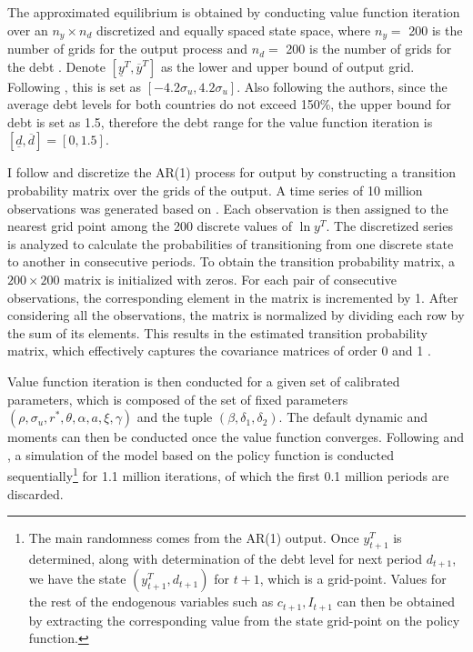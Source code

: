 The approximated equilibrium is obtained by conducting value function iteration over an $n_y \times n_d$ discretized and equally spaced state space,
where $n_y = $ 200 is the number of grids for the output process and $n_d=$ 200 is the number of grids for the debt \citep{Na-18}. Denote $[\underline{y}^T, \overline{y}^T]$ as the lower and upper bound of output grid. Following \citet{Uribe-Schmitt-Grohe-textbook}, this is set as $[-4.2 \sigma_u, 4.2 \sigma_u]$. Also following the authors, since the average debt levels for both countries do not exceed 150\%, the upper bound for debt is set as 1.5, therefore the debt range for the value function iteration is $[\underline{d}, \overline{d}]=[0,1.5]$.

I follow \citet{Schmitt-Uribe-16} and discretize the AR(1) process for output by constructing a transition probability matrix over the grids of the output.
A time series of 10 million observations was generated based on . Each observation is then assigned to the nearest grid point among the 200 discrete values of $\ln y^T$. The discretized series is analyzed to calculate the probabilities of transitioning from one discrete state to another in consecutive periods.
To obtain the transition probability matrix, a $200\times200$ matrix is initialized with zeros. For each pair of consecutive observations, the corresponding element in the matrix is incremented by 1. After considering all the observations, the matrix is normalized by dividing each row by the sum of its elements. This results in the estimated transition probability matrix, which effectively captures the covariance matrices of order 0 and 1
\citep*{Uribe-Schmitt-Grohe-textbook}.

Value function iteration is then conducted for a given set of calibrated parameters, which is composed of the set of fixed parameters $(\rho, \sigma_u, r^*, \theta, \alpha, a, \xi, \gamma)$ and the tuple $(\beta, \delta_1, \delta_2)$. The default dynamic and moments can then be conducted once the value function converges. Following \citet{Uribe-Schmitt-Grohe-textbook} and \citet{Na-18}, a simulation of the model based on the policy function is conducted sequentially\footnote{
    The main randomness comes from the AR(1) output. Once $y^T_{t+1}$ is determined, along with determination of the debt level for next period $d_{t+1}$, we have the state $(y^T_{t+1}, d_{t+1})$ for $t+1$, which is a grid-point. Values for the rest of the endogenous variables such as $c_{t+1}, I_{t+1}$ can then be obtained by extracting the corresponding value from the state grid-point on the policy function.
} for 1.1 million iterations, of which the first 0.1 million periods are discarded.

